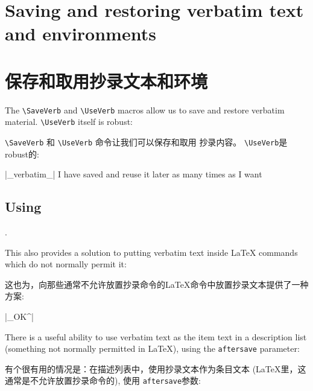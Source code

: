 \documentclass[twoside]{article}
\newcommand\cs[1]{\texttt{\textbackslash#1}}
\newcommand\verbatimTxt{抄录}
\begin{document}
%   \begin{MyVerbatim}[numbers=none,

\section{Saving and restoring verbatim text and environments}
\section{保存和取用{\verbatimTxt}文本和环境}


  The \cs{SaveVerb} and \cs{UseVerb} macros allow us to save and restore
verbatim material. \cs{UseVerb} itself is robust:

\cs{SaveVerb} 和 \cs{UseVerb} 命令让我们可以保存和取用
{\verbatimTxt}内容。 \cs{UseVerb}是robust的:

%  \DefineShortVerb{\|}
%  \SaveVerb{Verb}|_verbatim_|
\begin{SideBySideExample}
  \DefineShortVerb{\|}
  |_verbatim_|
  I have saved  and reuse 
  it later as many times as I want
  \subsection*{Using }
  .
\end{SideBySideExample}


  This also provides a solution to putting verbatim text inside \LaTeX{}
commands which do not normally permit it: %

  这也为，向那些通常不允许放置抄录命令的\LaTeX{}命令中放置抄录文本提供了一种方案: %

{
\begin{Example}
  \DefineShortVerb{\|}|_OK^| 
\end{Example}
}

  There is a useful ability to use verbatim text as the item text in a
description list (something not normally permitted in \LaTeX), using the
\texttt{aftersave} parameter:

  有个很有用的情况是：在描述列表中，使用抄录文本作为条目文本
 (\LaTeX 里，这通常是不允许放置抄录命令的), 使用
\texttt{aftersave}参数:
\end{document}
